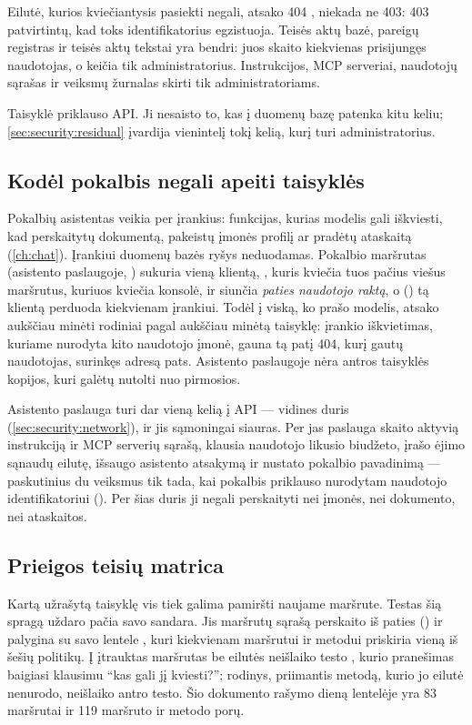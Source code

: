 Eilutė, kurios kviečiantysis pasiekti negali, atsako 404 , niekada ne 403:
403 patvirtintų, kad toks identifikatorius egzistuoja. Teisės aktų bazė, pareigų registras ir
teisės aktų tekstai yra bendri: juos skaito kiekvienas prisijungęs naudotojas, o keičia tik
administratorius. Instrukcijos, MCP serveriai, naudotojų sąrašas ir veiksmų žurnalas skirti
tik administratoriams.

Taisyklė priklauso API. Ji nesaisto to, kas į duomenų bazę patenka kitu keliu;
\cref{sec:security:residual} įvardija vienintelį tokį kelią, kurį turi administratorius.

\subsection{Kodėl pokalbis negali apeiti taisyklės}

Pokalbių asistentas veikia per įrankius: funkcijas, kurias modelis gali iškviesti, kad
perskaitytų dokumentą, pakeistų įmonės profilį ar pradėtų ataskaitą (\cref{ch:chat}).
Įrankiui duomenų bazės ryšys neduodamas. Pokalbio maršrutas (asistento paslaugoje,
) sukuria vieną klientą, , kuris kviečia tuos pačius
viešus maršrutus, kuriuos kviečia konsolė, ir siunčia \emph{paties naudotojo raktą}, o
 () tą klientą perduoda kiekvienam įrankiui. Todėl į
viską, ko prašo modelis, atsako aukščiau minėti rodiniai pagal aukščiau minėtą taisyklę:
įrankio iškvietimas, kuriame nurodyta kito naudotojo įmonė, gauna tą patį 404, kurį gautų
naudotojas, surinkęs adresą pats. Asistento paslaugoje nėra antros taisyklės kopijos, kuri
galėtų nutolti nuo pirmosios.

Asistento paslauga turi dar vieną kelią į API --- vidines duris
(\cref{sec:security:network}), ir jis sąmoningai siauras. Per jas paslauga skaito aktyvią
instrukciją ir MCP serverių sąrašą, klausia naudotojo likusio biudžeto, įrašo ėjimo sąnaudų
eilutę, išsaugo asistento atsakymą ir nustato pokalbio pavadinimą --- paskutinius du veiksmus
tik tada, kai pokalbis priklauso nurodytam naudotojo identifikatoriui
(). Per šias duris ji negali perskaityti nei įmonės, nei
dokumento, nei ataskaitos.

\subsection{Prieigos teisių matrica}

Kartą užrašytą taisyklę vis tiek galima pamiršti naujame maršrute. Testas
 šią spragą uždaro pačia savo sandara. Jis maršrutų sąrašą
perskaito iš paties  () ir palygina su savo lentele
, kuri kiekvienam maršrutui ir metodui priskiria vieną iš šešių politikų. Į
 įtrauktas maršrutas be eilutės neišlaiko testo
, kurio pranešimas baigiasi klausimu \enquote{kas gali jį
kviesti?}; rodinys, priimantis metodą, kurio jo eilutė nenurodo, neišlaiko antro testo. Šio
dokumento rašymo dieną lentelėje yra 83 maršrutai ir 119 maršruto ir metodo porų.

